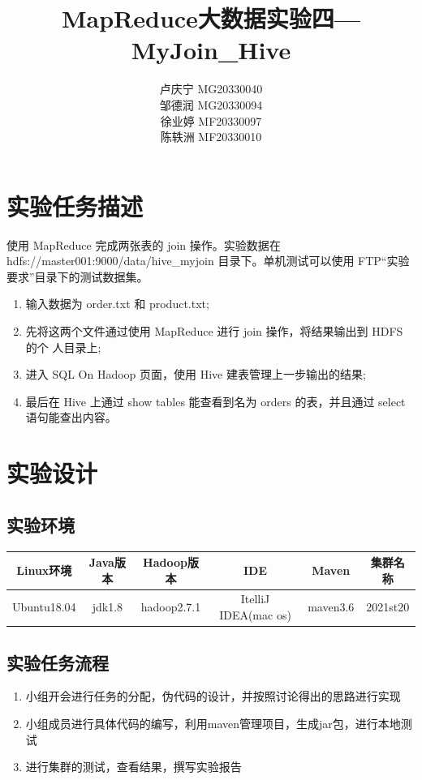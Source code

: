 \documentclass{article}
\title{MapReduce大数据实验四—MyJoin\_Hive}
\author{卢庆宁 MG20330040\\邹德润 MG20330094\\徐业婷 MF20330097\\陈轶洲 MF20330010}
\begin{document}
	\maketitle

\section{实验任务描述}
使用 MapReduce 完成两张表的 join 操作。实验数据在 hdfs://master001:9000/data/hive\_myjoin 目录下。单机测试可以使用
FTP“实验要求”目录下的测试数据集。
\begin{enumerate}[1)]
	\item 输入数据为 order.txt 和 product.txt;
	\item 先将这两个文件通过使用 MapReduce 进行 join 操作，将结果输出到 HDFS 的个
	人目录上;
	\item 进入 SQL On Hadoop 页面，使用 Hive 建表管理上一步输出的结果;
	\item 最后在 Hive 上通过 show tables 能查看到名为 orders 的表，并且通过 select
	语句能查出内容。
\end{enumerate}

\section{实验设计}

\subsection{实验环境}
\begin{table}[htbp]
	\centering
	\begin{tabular}{cccccc}
		\toprule    Linux环境 & Java版本  & Hadoop版本 & IDE& Maven&集群名称 \\
		\midrule   Ubuntu18.04 & jdk1.8 & hadoop2.7.1 &ItelliJ IDEA(mac os)&maven3.6&2021st20\\   
		\bottomrule   
	\end{tabular}  
\end{table}

\subsection{实验任务流程}
\begin{enumerate}[1)]
	\item 小组开会进行任务的分配，伪代码的设计，并按照讨论得出的思路进行实现
	\item 小组成员进行具体代码的编写，利用maven管理项目，生成jar包，进行本地测试
	\item 进行集群的测试，查看结果，撰写实验报告
\end{enumerate}
\end{document}

